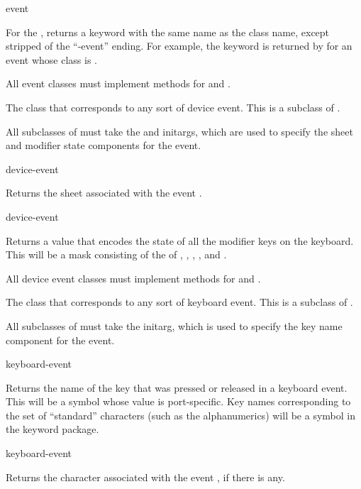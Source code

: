  {event}

For the  , returns a keyword with the same name as the
class name, except stripped of the ``-event'' ending.  For example, the keyword
 is returned by  for an event whose class is
.

All event classes must implement methods for  and
.



The class that corresponds to any sort of device event.  This is a subclass of
.

All subclasses of  must take the  and
 initargs, which are used to specify the sheet and modifier
state components for the event.

 {device-event}

Returns the sheet associated with the event .

 {device-event}

Returns a value that encodes the state of all the modifier keys on the keyboard.
This will be a mask consisting of the  of ,
, , , and .

All device event classes must implement methods for  and
.



The class that corresponds to any sort of keyboard event.  This is a subclass of
.

All subclasses of  must take the  initarg,
which is used to specify the key name component for the event.

 {keyboard-event}

Returns the name of the key that was pressed or released in a keyboard event.
This will be a symbol whose value is port-specific.  Key names corresponding to
the set of ``standard'' characters (such as the alphanumerics) will be a symbol
in the keyword package.

 {keyboard-event}

Returns the character associated with the event , if there
is any.

